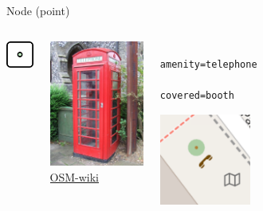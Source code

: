 \documentclass{beamer}
\begin{document}
			\begin{frame}[fragile]{Node (point)}
				\begin{center}
					\begin{columns}
						\begin{column}{1.25cm}
							\centering
							\includegraphics[width=1cm]{images/240px-Mf_node.png}
						\end{column}
						\begin{column}{3.75cm}
							\centering
							\includegraphics[width=3.5cm]{images/red-telephone-box-uk.jpg}\\
							\textcolor{gray}{
								\tiny
								\href{https://wiki.openstreetmap.org/wiki/File:Red\_telephone\_box\_-\_geograph.org.uk\_-_919348.jpg}{OSM-wiki}
							}
						\end{column}
						\begin{column}{3.5cm}
							\begin{verbatim}
								amenity=telephone
								covered=booth
							\end{verbatim}
							\includegraphics[height=3cm]{images/telephone.png}
						\end{column}
					\end{columns}
				\end{center}
			\end{frame}
		
\end{document}
